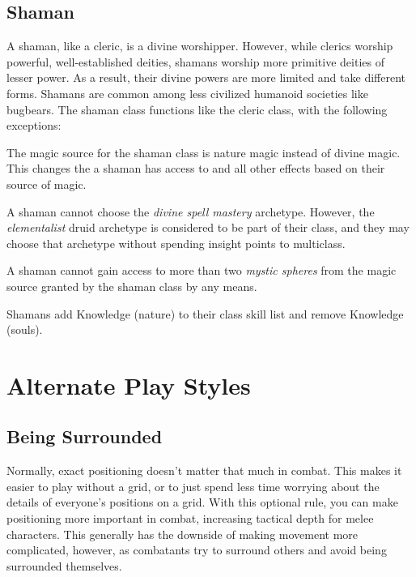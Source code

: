   \subsection{Shaman}
    A shaman, like a cleric, is a divine worshipper.
    However, while clerics worship powerful, well-established deities, shamans worship more primitive deities of lesser power.
    As a result, their divine powers are more limited and take different forms.
    Shamans are common among less civilized humanoid societies like bugbears.
    The shaman class functions like the cleric class, with the following exceptions:
    \begin{raggeditemize}
      \item The magic source for the shaman class is nature magic instead of divine magic.
        This changes the  a shaman has access to and all other effects based on their source of magic.
      \item A shaman cannot choose the \textit{divine spell mastery} archetype. However, the \textit{elementalist} druid archetype is considered to be part of their class, and they may choose that archetype without spending insight points to multiclass.
      \item A shaman cannot gain access to more than two \textit{mystic spheres} from the magic source granted by the shaman class by any means.
      \item Shamans add Knowledge (nature) to their class skill list and remove Knowledge (souls).
    \end{raggeditemize}

\section{Alternate Play Styles}

  \subsection{Being Surrounded}\label{Being Surrounded}
    Normally, exact positioning doesn't matter that much in combat.
    This makes it easier to play without a grid, or to just spend less time worrying about the details of everyone's positions on a grid.
    With this optional rule, you can make positioning more important in combat, increasing tactical depth for melee characters.
    This generally has the downside of making movement more complicated, however, as combatants try to surround others and avoid being surrounded themselves.

